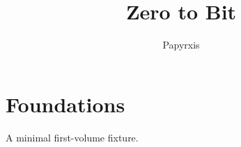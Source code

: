 \documentclass[11pt,oneside]{book}
\title{Zero to Bit}
\author{Papyrxis}
\begin{document}
\maketitle
\chapter{Foundations}
A minimal first-volume fixture.
\end{document}
